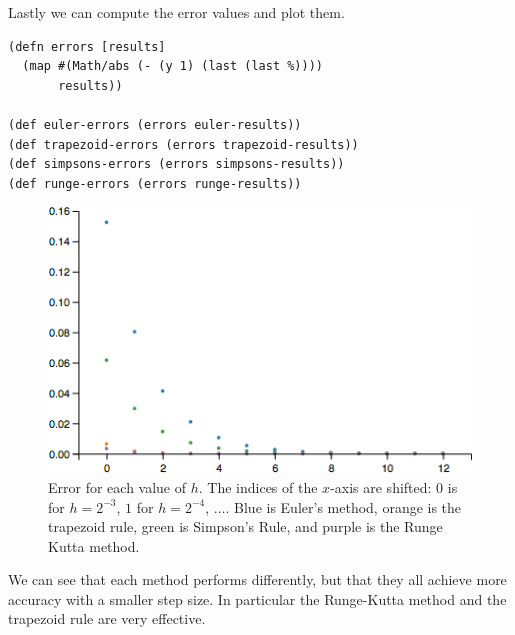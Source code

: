 {\begin{enumerate}[leftmargin=0pt]
\end{enumerate}

Lastly we can compute the error values and plot them.

\begin{verbatim}
(defn errors [results]
  (map #(Math/abs (- (y 1) (last (last %))))
       results))

(def euler-errors (errors euler-results))
(def trapezoid-errors (errors trapezoid-results))
(def simpsons-errors (errors simpsons-results))
(def runge-errors (errors runge-results))
\end{verbatim}

\begin{figure}[H]
\centering
\includegraphics[scale=0.65]{numerical-comparison-errors.png}
\caption{Error for each value of $h$. The indices of the $x$-axis are
shifted: $0$ is for $h = 2^{-3}$, $1$ for $h = 2^{-4}$, $\dots$. Blue
is Euler's method, orange is the trapezoid rule, green is Simpson's
Rule, and purple is the Runge Kutta method.}
\end{figure}

We can see that each method performs differently, but that they all
achieve more accuracy with a smaller step size. In particular the
Runge-Kutta method and the trapezoid rule are very effective.

}
